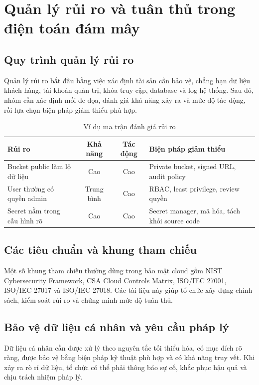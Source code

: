 \chapter{Quản lý rủi ro và tuân thủ trong điện toán đám mây}

\section{Quy trình quản lý rủi ro}
Quản lý rủi ro bắt đầu bằng việc xác định tài sản cần bảo vệ, chẳng hạn dữ liệu khách hàng, tài khoản quản trị, khóa truy cập, database và log hệ thống. Sau đó, nhóm cần xác định mối đe dọa, đánh giá khả năng xảy ra và mức độ tác động, rồi lựa chọn biện pháp giảm thiểu phù hợp.

\begin{table}[H]
\centering
\caption{Ví dụ ma trận đánh giá rủi ro}
\begin{tabularx}{\textwidth}{|X|c|c|X|}
\hline
\textbf{Rủi ro} & \textbf{Khả năng} & \textbf{Tác động} & \textbf{Biện pháp giảm thiểu} \\
\hline
Bucket public làm lộ dữ liệu & Cao & Cao & Private bucket, signed URL, audit policy \\
\hline
User thường có quyền admin & Trung bình & Cao & RBAC, least privilege, review quyền \\
\hline
Secret nằm trong cấu hình rõ & Cao & Cao & Secret manager, mã hóa, tách khỏi source code \\
\hline
\end{tabularx}
\end{table}

\section{Các tiêu chuẩn và khung tham chiếu}
Một số khung tham chiếu thường dùng trong bảo mật cloud gồm NIST Cybersecurity Framework, CSA Cloud Controls Matrix, ISO/IEC 27001, ISO/IEC 27017 và ISO/IEC 27018. Các tài liệu này giúp tổ chức xây dựng chính sách, kiểm soát rủi ro và chứng minh mức độ tuân thủ.

\section{Bảo vệ dữ liệu cá nhân và yêu cầu pháp lý}
Dữ liệu cá nhân cần được xử lý theo nguyên tắc tối thiểu hóa, có mục đích rõ ràng, được bảo vệ bằng biện pháp kỹ thuật phù hợp và có khả năng truy vết. Khi xảy ra rò rỉ dữ liệu, tổ chức có thể phải thông báo sự cố, khắc phục hậu quả và chịu trách nhiệm pháp lý.

